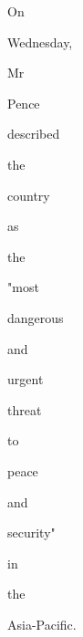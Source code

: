 \documentclass[varwidth]{standalone}
\begin{document}
\begin{CJK*}{UTF8}{gbsn}
{{{\colorbox{red!100.0}{\strut On} \colorbox{red!28.888888888888886}{\strut Wednesday,} \colorbox{red!85.55555555555556}{\strut Mr} \colorbox{red!72.22222222222221}{\strut Pence} \colorbox{red!33.33333333333333}{\strut described} \colorbox{red!31.11111111111111}{\strut the} \colorbox{red!90.0}{\strut country} \colorbox{red!97.77777777777777}{\strut as} \colorbox{red!5.555555555555555}{\strut the} \colorbox{red!61.111111111111114}{\strut "most} \colorbox{red!84.44444444444444}{\strut dangerous} \colorbox{red!13.333333333333334}{\strut and} \colorbox{red!77.77777777777779}{\strut urgent} \colorbox{red!15.555555555555555}{\strut threat} \colorbox{red!20.0}{\strut to} \colorbox{red!32.22222222222222}{\strut peace} \colorbox{red!35.55555555555556}{\strut and} \colorbox{red!40.0}{\strut security"} \colorbox{red!4.444444444444445}{\strut in} \colorbox{red!16.666666666666664}{\strut the} \colorbox{red!91.11111111111111}{\strut Asia-Pacific.} 
}}}
\end{CJK*}
\end{document}
